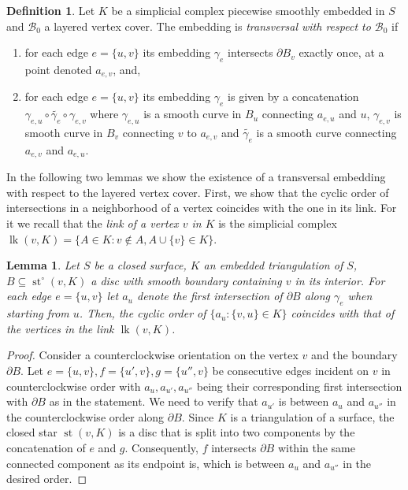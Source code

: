 \documentclass[reqno,english]{amsart}
\newtheorem{lemma}[theorem]{Lemma}
\numberwithin{claimcounter}{theorem}
\theoremstyle{remark}
\theoremstyle{definition}
\newtheorem{definition}[theorem]{Definition}
\numberwithin{theorem}{section}
\DeclareMathOperator{\st}{st}
\DeclareMathOperator{\lk}{lk}
\begin{document}
\begin{definition}
    Let $K$ be a simplicial complex piecewise smoothly embedded in $S$ and $\mathcal{B}_0$ a layered vertex cover. The embedding is \emph{transversal with respect to $\mathcal{B}_0$} if
    \begin{enumerate}
        \item for each edge $e=\{u,v\}$ its embedding $\gamma_e$ intersects $\partial B_v$ exactly once, at a point denoted $a_{e,v}$, and, 
        \item for each edge $e=\{u,v\}$ its embedding $\gamma_e$ is given by a concatenation $\gamma_{e,u}\circ \widetilde{\gamma_e}\circ \gamma_{e,v}$ where $\gamma_{e,u}$ is a smooth curve in $B_u$ connecting $a_{e,u}$ and $u$, $\gamma_{e,v}$ is smooth curve in $B_v$ connecting $v$ to $a_{e,v}$ and $\widetilde{\gamma_e}$ is a smooth curve connecting $a_{e,v}$ and $a_{e,u}$.
    \end{enumerate}
\end{definition}


In the following two lemmas we show the existence of a transversal embedding with respect to the layered vertex cover. 
First, we show that the cyclic order of intersections in a neighborhood of a vertex coincides with the one in its link. For it we recall that the \emph{link of a vertex $v$ in $K$} is the simplicial complex $\lk(v,K)=\{A\in K\colon v\notin A, A\cup \{v\}\in K\}$.

\begin{lemma}
\label{l:incidenceorder}
Let $S$ be a closed surface, $K$ an embedded triangulation of $S$,
$B \subseteq \st^\circ(v,K)$ a disc with smooth boundary containing $v$ in its interior.
For each edge $e=\{u,v\}$ let $a_u$ denote the first intersection of $\partial B$ along $\gamma_e$ when starting from $u$.
Then, the cyclic order of $\{a_u\colon \{v,u\}\in K\}$ coincides with that of the vertices in the link $\lk(v,K)$.
\end{lemma}
\begin{proof}
Consider a counterclockwise orientation on the vertex  $v$ and the boundary $\partial B$.
Let $e=\{u,v\},f=\{u',v\},g=\{u'',v\}$ be consecutive edges incident on $v$ in counterclockwise order with $a_u,a_{u'},a_{u''}$
being their corresponding first intersection with $\partial B$ as in the statement.
We need to verify that $a_{u'}$ is between $a_u$ and $a_{u''}$ in the counterclockwise order along
$\partial B$. Since $K$ is a triangulation of a surface, the closed star $\st(v,K)$ is
a disc that is split into two components by the concatenation of $e$ and $g$.
Consequently, $f$ intersects $\partial B$ within the same connected component as its endpoint is, which is between $a_u$ and $a_{u''}$ in the desired order.
\end{proof}
\end{document}
